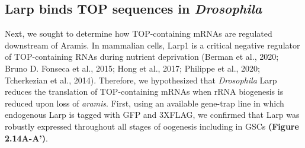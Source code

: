 \documentclass[12pt,oneside]{reedthesis}
\begin{document}
\textbf{\hfill\break
}

\hypertarget{larp-binds-top-sequences-in-drosophila}{%
\subsection{\texorpdfstring{Larp binds TOP sequences in \emph{Drosophila}}{Larp binds TOP sequences in Drosophila}}\label{larp-binds-top-sequences-in-drosophila}}

Next, we sought to determine how TOP-containing mRNAs are regulated downstream of Aramis. In mammalian cells, Larp1 is a critical negative regulator of TOP-containing RNAs during nutrient deprivation (Berman et al., 2020; Bruno D. Fonseca et al., 2015; Hong et al., 2017; Philippe et al., 2020; Tcherkezian et al., 2014). Therefore, we hypothesized that \emph{Drosophila} Larp reduces the translation of TOP-containing mRNAs when rRNA biogenesis is reduced upon loss of \emph{aramis}. First, using an available gene-trap line in which endogenous Larp is tagged with GFP and 3XFLAG, we confirmed that Larp was robustly expressed throughout all stages of oogenesis including in GSCs \textbf{(Figure 2.14A-A')}.
\end{document}
